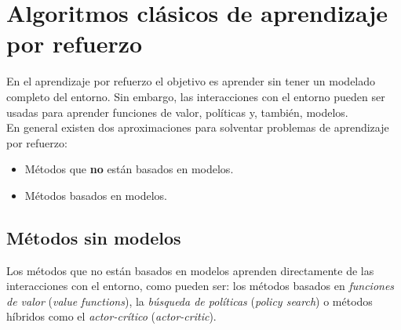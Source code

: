 \section{Algoritmos clásicos de aprendizaje por refuerzo} \label{algoritmos_clasicos_de_apredizaje_por_refuerzo}

En el aprendizaje por refuerzo el objetivo es aprender sin tener un modelado completo del entorno. Sin embargo, las interacciones con el entorno pueden ser usadas para aprender funciones de valor, políticas y, también, modelos.\\

En general existen dos aproximaciones para solventar problemas de aprendizaje por refuerzo:\\

\begin{itemize}
    \item Métodos que \textbf{no} están basados en modelos.
    \item Métodos basados en modelos.
\end{itemize}

\subsection{Métodos sin modelos}

\noindent
Los métodos que no están basados en modelos aprenden directamente de las interacciones con el entorno, como pueden ser: los métodos basados en \textit{funciones de valor} (\textit{value functions}), la \textit{búsqueda de políticas} (\textit{policy search}) o métodos híbridos como el \textit{actor-crítico} (\textit{actor-critic}).\\

